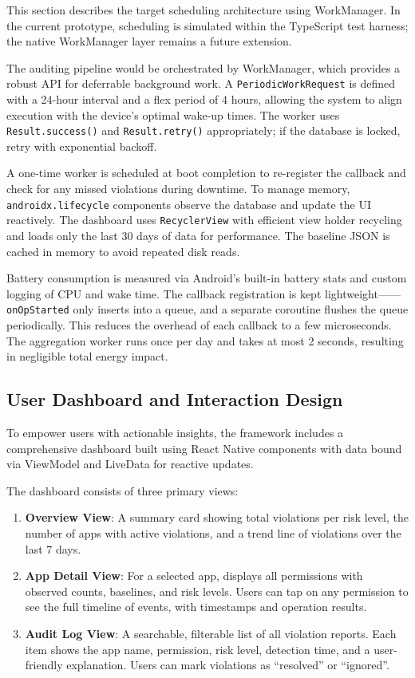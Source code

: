 This section describes the target scheduling architecture using WorkManager. In the current prototype, scheduling is simulated within the TypeScript test harness; the native WorkManager layer remains a future extension.

The auditing pipeline would be orchestrated by WorkManager, which provides a robust API for deferrable background work. A \texttt{PeriodicWorkRequest} is defined with a 24-hour interval and a flex period of 4 hours, allowing the system to align execution with the device's optimal wake-up times. The worker uses \texttt{Result.success()} and \texttt{Result.retry()} appropriately; if the database is locked, retry with exponential backoff.

A one-time worker is scheduled at boot completion to re-register the callback and check for any missed violations during downtime. To manage memory, \texttt{androidx.lifecycle} components observe the database and update the UI reactively. The dashboard uses \texttt{RecyclerView} with efficient view holder recycling and loads only the last 30 days of data for performance. The baseline JSON is cached in memory to avoid repeated disk reads.

Battery consumption is measured via Android's built-in battery stats and custom logging of CPU and wake time. The callback registration is kept lightweight——\texttt{onOpStarted} only inserts into a queue, and a separate coroutine flushes the queue periodically. This reduces the overhead of each callback to a few microseconds. The aggregation worker runs once per day and takes at most 2 seconds, resulting in negligible total energy impact.

\subsection{User Dashboard and Interaction Design}

To empower users with actionable insights, the framework includes a comprehensive dashboard built using React Native components with data bound via ViewModel and LiveData for reactive updates.

The dashboard consists of three primary views:
\begin{enumerate}
\item \textbf{Overview View}: A summary card showing total violations per risk level, the number of apps with active violations, and a trend line of violations over the last 7 days.
\item \textbf{App Detail View}: For a selected app, displays all permissions with observed counts, baselines, and risk levels. Users can tap on any permission to see the full timeline of events, with timestamps and operation results.
\item \textbf{Audit Log View}: A searchable, filterable list of all violation reports. Each item shows the app name, permission, risk level, detection time, and a user-friendly explanation. Users can mark violations as ``resolved'' or ``ignored''.
\end{enumerate}

